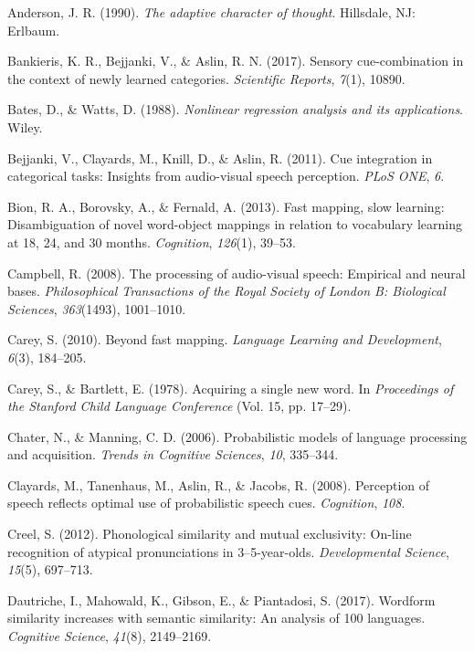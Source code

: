\documentclass[english,floatsintext,man]{apa6}
\theoremstyle{definition}
\theoremstyle{definition}
\theoremstyle{definition}
\theoremstyle{remark}
\begin{document}
\hypertarget{refs}{}
\hypertarget{ref-anderson90}{}
Anderson, J. R. (1990). \emph{The adaptive character of thought}.
Hillsdale, NJ: Erlbaum.

\hypertarget{ref-Bankieris17}{}
Bankieris, K. R., Bejjanki, V., \& Aslin, R. N. (2017). Sensory
cue-combination in the context of newly learned categories.
\emph{Scientific Reports}, \emph{7}(1), 10890.

\hypertarget{ref-bates88}{}
Bates, D., \& Watts, D. (1988). \emph{Nonlinear regression analysis and
its applications}. Wiley.

\hypertarget{ref-bejjanki2011}{}
Bejjanki, V., Clayards, M., Knill, D., \& Aslin, R. (2011). Cue
integration in categorical tasks: Insights from audio-visual speech
perception. \emph{PLoS ONE}, \emph{6}.

\hypertarget{ref-bion2013}{}
Bion, R. A., Borovsky, A., \& Fernald, A. (2013). Fast mapping, slow
learning: Disambiguation of novel word-object mappings in relation to
vocabulary learning at 18, 24, and 30 months. \emph{Cognition},
\emph{126}(1), 39--53.

\hypertarget{ref-Campbell2008}{}
Campbell, R. (2008). The processing of audio-visual speech: Empirical
and neural bases. \emph{Philosophical Transactions of the Royal Society
of London B: Biological Sciences}, \emph{363}(1493), 1001--1010.

\hypertarget{ref-carey2010}{}
Carey, S. (2010). Beyond fast mapping. \emph{Language Learning and
Development}, \emph{6}(3), 184--205.

\hypertarget{ref-carey1978b}{}
Carey, S., \& Bartlett, E. (1978). Acquiring a single new word. In
\emph{Proceedings of the Stanford Child Language Conference} (Vol. 15,
pp. 17--29).

\hypertarget{ref-chater06}{}
Chater, N., \& Manning, C. D. (2006). Probabilistic models of language
processing and acquisition. \emph{Trends in Cognitive Sciences},
\emph{10}, 335--344.

\hypertarget{ref-clayard08}{}
Clayards, M., Tanenhaus, M., Aslin, R., \& Jacobs, R. (2008). Perception
of speech reflects optimal use of probabilistic speech cues.
\emph{Cognition}, \emph{108}.

\hypertarget{ref-Creel2012}{}
Creel, S. (2012). Phonological similarity and mutual exclusivity:
On-line recognition of atypical pronunciations in 3--5-year-olds.
\emph{Developmental Science}, \emph{15}(5), 697--713.

\hypertarget{ref-dautriche17}{}
Dautriche, I., Mahowald, K., Gibson, E., \& Piantadosi, S. (2017).
Wordform similarity increases with semantic similarity: An analysis of
100 languages. \emph{Cognitive Science}, \emph{41}(8), 2149--2169.
\end{document}
